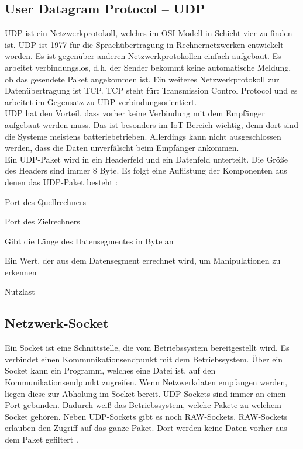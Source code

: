 \subsection{User Datagram Protocol -- UDP}
UDP ist ein Netzwerkprotokoll, welches im OSI-Modell in Schicht vier zu finden ist. UDP ist 1977 für die Sprachübertragung in Rechnernetzwerken entwickelt worden. Es ist gegenüber anderen Netzwerkprotokollen einfach aufgebaut. Es arbeitet verbindungslos, d.h. der Sender bekommt keine automatische Meldung, ob das gesendete Paket angekommen ist. Ein weiteres Netzwerkprotokoll zur Datenübertragung ist TCP. TCP steht für: Transmission Control Protocol und es arbeitet im Gegensatz zu UDP verbindungsorientiert.
\\
UDP hat den Vorteil, dass vorher keine Verbindung mit dem Empfänger aufgebaut werden muss. Das ist besonders im IoT-Bereich wichtig, denn dort sind die Systeme meistens batteriebetrieben. Allerdings kann nicht ausgeschlossen werden, dass die Daten unverfälscht beim Empfänger ankommen.
\\
Ein UDP-Paket wird in ein Headerfeld und ein Datenfeld unterteilt. Die Größe des Headers sind immer 8 Byte. Es folgt eine Auflistung der Komponenten aus denen das UDP-Paket besteht \cite{src_UDP}:
\\
\begin{description}[style=multiline,leftmargin=3cm]
\item [Quellport] 	Port des Quellrechners
\item [Zielport]  	Port des Zielrechners
\item [Länge]		Gibt die Länge des Datensegmentes in Byte an
\item [Prüfsumme]	Ein Wert, der aus dem Datensegment errechnet wird, um Manipulationen zu erkennen
\item [Daten]		Nutzlast
\end{description}

\subsection{Netzwerk-Socket}
Ein Socket ist eine Schnittstelle, die vom Betriebssystem bereitgestellt wird. Es verbindet einen Kommunikationsendpunkt mit dem Betriebssystem. Über ein Socket kann ein Programm, welches eine Datei ist, auf den Kommunikationsendpunkt zugreifen. Wenn Netzwerkdaten empfangen werden, liegen diese zur Abholung im Socket bereit. 
UDP-Sockets sind immer an einen Port gebunden. Dadurch weiß das Betriebssystem, welche Pakete zu welchem Socket gehören. Neben UDP-Sockets gibt es noch RAW-Sockets. RAW-Sockets erlauben den Zugriff auf das ganze Paket. Dort werden keine Daten vorher aus dem Paket gefiltert \cite{src_SOCKET}.

